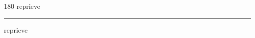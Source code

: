
\begin{frame}
\begin{center}
\begin{turn}{180}
{\fontsize{2.5cm}{1em}\selectfont reprieve}
\end{turn}
\vspace{1em}\par  
\hrule
\vspace{1em}\par  
{\fontsize{2.5cm}{1em}\selectfont reprieve}
\end{center}
\end{frame}
